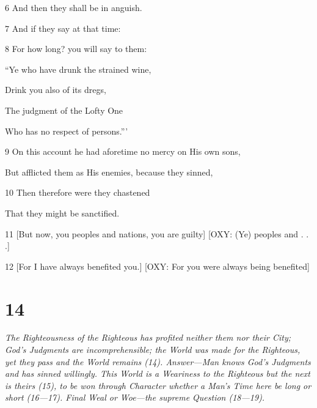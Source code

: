 \par 6 And then they shall be in anguish. 

\par 7 And if they say at that time:

\par 8 For how long? you will say to them:

\par “Ye who have drunk the strained wine,

\par Drink you also of its dregs,

\par The judgment of the Lofty One

\par Who has no respect of persons.”’

\par 9 On this account he had aforetime no mercy on His own sons,

\par But afflicted them as His enemies, because they sinned,

\par 10 Then therefore were they chastened

\par That they might be sanctified.

\par 11 [But now, you peoples and nations, you are guilty] [OXY: (Ye) peoples and . . .]

\par [Because you have always trodden down the earth,] [OXY: (Ye) have trodden down the earth]

\par [And used the creation unrighteously.] [OXY: And misused the created things in it.]

\par 12 [For I have always benefited you.] [OXY: For you were always being benefited]

\par [And you have always been ungrateful for the bene­ficence.] [OXY: But you were always ungrateful.]

\chapter{14}

\par \textit{The Righteousness of the Righteous has profited neither them nor their City; God's Judgments are incomprehensible; the World was made for the Righteous, yet they pass and the World remains (14). Answer—Man knows God's Judgments and has sinned willingly. This World is a Weariness to the Righteous but the next is theirs (15), to be won through Character whether a Man's Time here be long or short (16—17). Final Weal or Woe—the supreme Question (18—19).}

